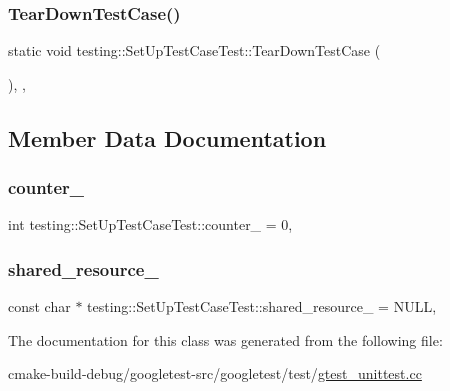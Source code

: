 \subsubsection{\texorpdfstring{TearDownTestCase()}{TearDownTestCase()}}
{\footnotesize\ttfamily static void testing\+::\+Set\+Up\+Test\+Case\+Test\+::\+Tear\+Down\+Test\+Case (\begin{DoxyParamCaption}{ }\end{DoxyParamCaption})\hspace{0.3cm}{\ttfamily [inline]}, {\ttfamily [static]}, {\ttfamily [protected]}}



\subsection{Member Data Documentation}
\mbox{\label{classtesting_1_1SetUpTestCaseTest_a5b6e811128d35389be49f6569bf93817}} 
\subsubsection{\texorpdfstring{counter\_}{counter\_}}
{\footnotesize\ttfamily int testing\+::\+Set\+Up\+Test\+Case\+Test\+::counter\+\_\+ = 0\hspace{0.3cm}{\ttfamily [static]}, {\ttfamily [protected]}}

\mbox{\label{classtesting_1_1SetUpTestCaseTest_a904e77fd9a628b6a9aca0280665fd040}} 
\subsubsection{\texorpdfstring{shared\_resource\_}{shared\_resource\_}}
{\footnotesize\ttfamily const char $\ast$ testing\+::\+Set\+Up\+Test\+Case\+Test\+::shared\+\_\+resource\+\_\+ = N\+U\+LL\hspace{0.3cm}{\ttfamily [static]}, {\ttfamily [protected]}}



The documentation for this class was generated from the following file\+:\begin{DoxyCompactItemize}
\item 
cmake-\/build-\/debug/googletest-\/src/googletest/test/\mbox{\hyperlink{gtest__unittest_8cc}{gtest\+\_\+unittest.\+cc}}\end{DoxyCompactItemize}
